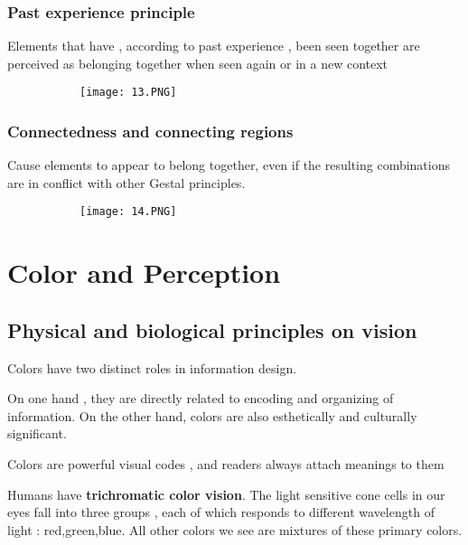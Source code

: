 \documentclass{article}
\begin{document}
\subsubsection{Past experience principle}

Elements that have , according to past experience , been seen together are perceived as belonging together when seen again or in a new context

\begin{figure}[ht!]
  \centering
  \begin{subfigure}[b]{0.5\linewidth}
    \texttt{[image: 13.PNG]}
  \end{subfigure}
\end{figure}

\subsubsection{Connectedness and connecting regions}

Cause elements to appear to belong together, even if the resulting combinations are in conflict with other Gestal principles.

\begin{figure}[ht!]
  \centering
  \begin{subfigure}[b]{0.5\linewidth}
    \texttt{[image: 14.PNG]}
  \end{subfigure}
\end{figure}

\section{Color and Perception}
\subsection{Physical and biological principles on vision}

Colors have two distinct roles in information design.

On one hand , they are directly related to encoding and organizing of information. On the other hand, colors are also esthetically and culturally significant.

Colors are powerful visual codes , and readers always attach meanings to them 

Humans have \textbf{trichromatic color vision}. The light sensitive cone cells in our eyes fall into three groups , each of which responds to different wavelength of light : red,green,blue. All other colors we see are mixtures of these primary colors.
\end{document}
